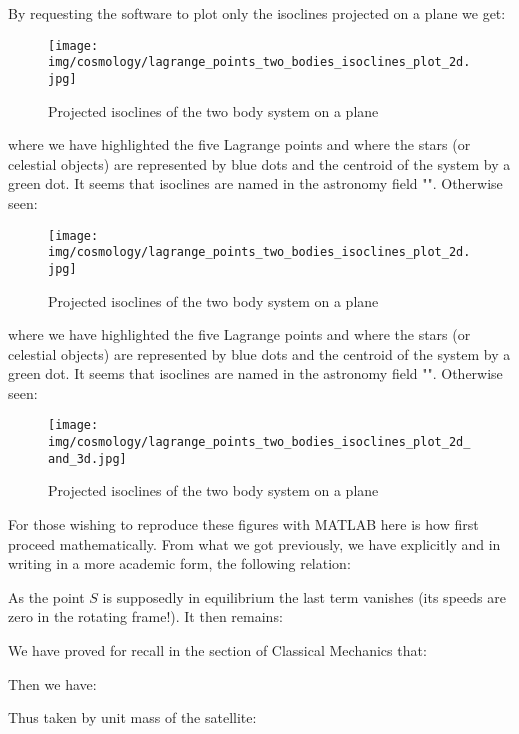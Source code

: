 	By requesting the software to plot only the isoclines projected on a plane we get:
	\begin{figure}[H]
		\begin{center}
		\texttt{[image: img/cosmology/lagrange\_points\_two\_bodies\_isoclines\_plot\_2d.jpg]}
		\end{center}	
		\caption{Projected isoclines of the two body system on a plane}
	\end{figure}
	where we have highlighted the five Lagrange points and where the stars (or celestial objects) are represented by blue dots and the centroid of the system by a green dot. It seems that isoclines are named in the astronomy field "". Otherwise seen:
	\begin{figure}[H]
		\begin{center}
		\texttt{[image: img/cosmology/lagrange\_points\_two\_bodies\_isoclines\_plot\_2d.jpg]}
		\end{center}	
		\caption[]{Projected isoclines of the two body system on a plane}
	\end{figure}
	where we have highlighted the five Lagrange points and where the stars (or celestial objects) are represented by blue dots and the centroid of the system by a green dot. It seems that isoclines are named in the astronomy field "". Otherwise seen:
	\begin{figure}[H]
		\begin{center}
		\texttt{[image: img/cosmology/lagrange\_points\_two\_bodies\_isoclines\_plot\_2d\_and\_3d.jpg]}
		\end{center}	
		\caption[]{Projected isoclines of the two body system on a plane}
	\end{figure}
	For those wishing to reproduce these figures with MATLAB here is how first proceed mathematically. From what we got previously, we have explicitly and in writing in a more academic form, the following relation:
	
	As the point $S$ is supposedly in equilibrium the last term vanishes (its speeds are zero in the rotating frame!). It then remains:
	
	We have proved for recall in the section of Classical Mechanics that:
	
	Then we have:
	
	Thus taken by unit mass of the satellite:
	
